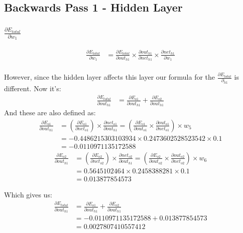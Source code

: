 \documentclass{article}
\begin{document}
\subsection{Backwards Pass 1 - Hidden Layer}
\subsubsection{$\frac{\partial E_{total}}{\partial w_1}$}
\begin{align*} \frac{\partial E_{total}}{\partial w_1} & =
    \frac{\partial E_{total}}{\partial out_{h1}} \times
    \frac{\partial out_{h1}}{\partial net_{h1}} \times
    \frac{\partial net_{h1}}{\partial w_1}
\end{align*}
\\
However, since the hidden layer affects this layer our formula for the $
    \frac{\partial E_{total}}{\partial_{h1}}
$ is different. Now it's:
\begin{align*}
    \frac{\partial E_{total}}{\partial out_{h1}} & = 
    \frac{\partial E_{o1}}{\partial out_{h1}} +
    \frac{\partial E_{o2}}{\partial out_{h1}}
\end{align*}
And these are also defined as:
\begin{align*}
    \frac{\partial E_{o1}}{\partial out_{h1}} & =
    (\frac{\partial E_{o1}}{\partial net_{o1}}) \times
    \frac{\partial net_{o1}}{\partial out_{h1}}
    = (\frac{\partial E_{o1}}{\partial out_{o1}} \times
        \frac{\partial out_{o1}}{\partial net_{o1}} ) \times w_5 \\
    & = -0.4486215303103934 \times 0.2473602528523542 \times 0.1 \\
    & = -0.0110971135172588
\end{align*}
\begin{align*}
    \frac{\partial E_{o2}}{\partial out_{h1}} & =
    (\frac{\partial E_{o2}}{\partial net_{o2}}) \times
    \frac{\partial net_{o2}}{\partial out_{h1}} 
    = (\frac{\partial E_{o2}}{\partial out_{o2}} \times
        \frac{\partial out_{o2}}{\partial net_{o2}} ) \times w_6 \\
    &= 0.5645102464 \times 0.2458388281 \times 0.1 \\
    & = 0.013877854573
\end{align*}

Which gives us:
\begin{align*}
    \frac{\partial E_{total}}{\partial out_{h1}} & = 
    \frac{\partial E_{o1}}{\partial out_{h1}} +
    \frac{\partial E_{o2}}{\partial out_{h1}} \\
    & =  -0.0110971135172588 + 0.013877854573 \\
    & = 0.0027807410557412
\end{align*}
\end{document}
